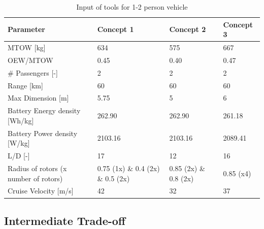 \begin{table}[H]
\captionsetup{justification=centering}
\caption{Input of tools for 1-2 person vehicle}
\label{12input}
\begin{tabular}{@{}llll@{}}
\toprule
\textbf{Parameter}                       & \textbf{Concept 1} & \textbf{Concept 2} & \textbf{Concept 3} \\ \midrule
MTOW {[}kg{]}                            &           634         &        575           &         667           \\
OEW/MTOW           &          0.45          &         0.40          &             0.47       \\
\# Passengers {[}-{]}                    &          2          &         2           &             2       \\
Range {[}km{]}                           &          60          &         60     &            60        \\
Max Dimension {[}m{]}                    &         5.75           &          5          &            6        \\
Battery Energy density {[}Wh/kg{]}       &           262.90         &       262.90  &            261.18        \\
Battery Power density {[}W/kg{]}         &           2103.16         &      2103.16 &            2089.41        \\
L/D {[}-{]}                              &           17         &        12            &           16         \\
Radius of rotors (x number of rotors) &   0.75 (1x) \& 0.4 (2x) \& 0.5 (2x)                &    0.85 (2x) \& 0.8 (2x)&            0.85 (x4)       \\
Cruise Velocity {[}m/s{]}                &          42          &        32            &            37        \\ \bottomrule
\end{tabular}

\end{table}


\subsection{Intermediate Trade-off}

